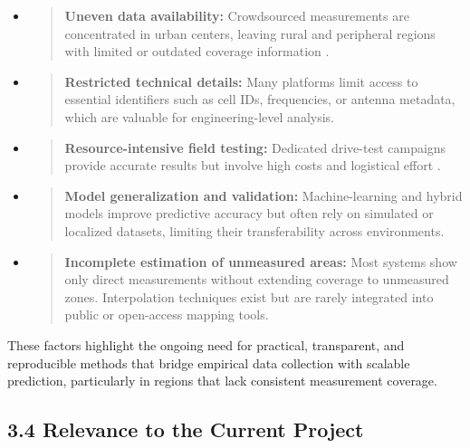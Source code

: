 \documentclass[11pt]{article}
\begin{document}
\begin{itemize}
\item
  \begin{quote}
  \textbf{Uneven data availability:} Crowdsourced measurements are
  concentrated in urban centers, leaving rural and peripheral regions
  with limited or outdated coverage information \cite{opensignal2024, cellmapper2024}.
  \end{quote}
\item
  \begin{quote}
  \textbf{Restricted technical details:} Many platforms limit access to
  essential identifiers such as cell IDs, frequencies, or antenna
  metadata, which are valuable for engineering-level analysis.
  \end{quote}
\item
  \begin{quote}
  \textbf{Resource-intensive field testing:} Dedicated drive-test
  campaigns provide accurate results but involve high costs and
  logistical effort \cite{flycomm2024}.
  \end{quote}
\item
  \begin{quote}
  \textbf{Model generalization and validation:} Machine-learning and
  hybrid models improve predictive accuracy \cite{li2023, zhang2023, ahmed2022}
  but often rely on simulated or localized datasets, limiting their
  transferability across environments.
  \end{quote}
\item
  \begin{quote}
  \textbf{Incomplete estimation of unmeasured areas:} Most systems show
  only direct measurements without extending coverage to unmeasured
  zones. Interpolation techniques exist \cite{shepard1968} but are rarely
  integrated into public or open-access mapping tools.
  \end{quote}
\end{itemize}

These factors highlight the ongoing need for practical, transparent, and
reproducible methods that bridge empirical data collection with scalable
prediction, particularly in regions that lack consistent measurement
coverage.


\hypertarget{relevance-to-the-current-project}{%
\subsection{3.4 Relevance to the Current
Project}\label{relevance-to-the-current-project}}
\end{document}
